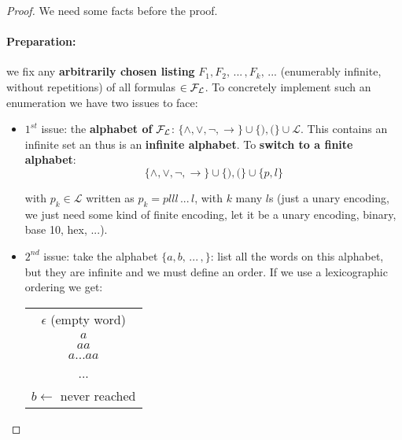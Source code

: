 \documentclass[11pt]{article}
\begin{document}
	\begin{proof}
		We need some facts before the proof.\\
		
		\paragraph{Preparation:} we fix any \textbf{arbitrarily chosen listing} $F_1, F_2, \, ... \, , F_k , \, ...$ (enumerably infinite, without repetitions) of all formulas $\in \mathcal{F}_\mathcal{L}$. To concretely implement such an enumeration we have two issues to face:
		
		\begin{itemize}
			 \item $1^{st}$ issue: the \textbf{alphabet of} $\mathcal{F}_\mathcal{L}$: $\{\wedge, \vee, \neg, \rightarrow\} \cup \{),(\} \cup \mathcal{L}$. This contains an infinite set an thus is an \textbf{infinite alphabet}. To \textbf{switch to a finite alphabet}: 
			$$ \{\wedge, \vee, \neg, \rightarrow\} \cup \{),(\} \cup \{p,l\} $$
			
			with $p_k \in \mathcal{L}$ written as $p_k = plll \, ... \, l$, with $k$ many $l$s (just a unary encoding, we just need some kind of finite encoding, let it be a unary encoding, binary, base 10, hex, ...).\\
			
			\newpage
			
			\item $2^{nd}$ issue: take the alphabet $\{a,b, \, ... \, , \}$: list all the words on this alphabet, but they are infinite and we must define an order. If we use a lexicographic ordering we get: 
			
			\begin{center}
				\begin{tabular}{| c |}
					\hline
					$\epsilon$ (empty word)\\
					$a$\\
					$aa$\\
					$a...aa$\\
					...\\
					$b \leftarrow$ never reached\\
					\hline
				\end{tabular}
			\end{center}
			

\end{itemize}
\end{proof}
\end{document}

